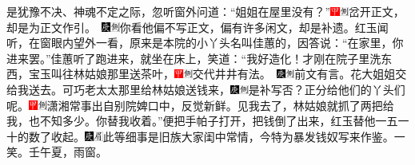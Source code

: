 是犹豫不决、神魂不定之际，忽听窗外问道：“姐姐在屋里没有？”{\includegraphics[width=3mm]{../Images/00002}\includegraphics[width=3mm]{../Images/00011}\footnotesize \kaishu 岔开正文，却是为正文作引。　\includegraphics[width=3mm]{../Images/00004}\includegraphics[width=3mm]{../Images/00011}\footnotesize \kaishu 你看他偏不写正文，偏有许多闲文，却是补遗。}红玉闻听，在窗眼内望外一看，原来是本院的小丫头名叫佳蕙的，因答说：“在家里，你进来罢。”佳蕙听了跑进来，就坐在床上，笑道：“我好造化！才刚在院子里洗东西，宝玉叫往林姑娘那里送茶叶，{\includegraphics[width=3mm]{../Images/00002}\includegraphics[width=3mm]{../Images/00011}\footnotesize \kaishu 交代井井有法。　\includegraphics[width=3mm]{../Images/00004}\includegraphics[width=3mm]{../Images/00011}\footnotesize \kaishu 前文有言。}花大姐姐交给我送去。可巧老太太那里给林姑娘送钱来，{\includegraphics[width=3mm]{../Images/00004}\includegraphics[width=3mm]{../Images/00011}\footnotesize \kaishu 是补写否？}正分给他们的丫头们呢。{\includegraphics[width=3mm]{../Images/00002}\includegraphics[width=3mm]{../Images/00011}\footnotesize \kaishu 潇湘常事出自别院婢口中，反觉新鲜。}见我去了，林姑娘就抓了两把给我，也不知多少。你替我收着。”便把手帕子打开，把钱倒了出来，红玉替他一五一十的数了收起。{\includegraphics[width=3mm]{../Images/00004}\includegraphics[width=3mm]{../Images/00010}\footnotesize \kaishu 此等细事是旧族大家闺中常情，今特为暴发钱奴写来作鉴。一笑。壬午夏，雨窗。}

